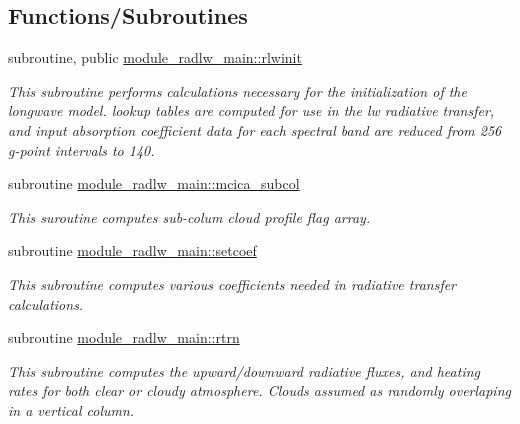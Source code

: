 \subsection*{Functions/\+Subroutines}
\begin{DoxyCompactItemize}
\item 
subroutine, public \hyperlink{namespacemodule__radlw__main_ad1f036ae760a7e9dcbbdd93492617bb3}{module\+\_\+radlw\+\_\+main\+::rlwinit}                                                                                             
\begin{DoxyCompactList}\small\item\em This subroutine performs calculations necessary for the initialization of the longwave model. lookup tables are computed for use in the lw radiative transfer, and input absorption coefficient data for each spectral band are reduced from 256 g-\/point intervals to 140. \end{DoxyCompactList}\item 
subroutine \hyperlink{namespacemodule__radlw__main_a6fd13528cd1e0335fb256c7f199e61bb}{module\+\_\+radlw\+\_\+main\+::mcica\+\_\+subcol}                                                                                   
\begin{DoxyCompactList}\small\item\em This suroutine computes sub-\/colum cloud profile flag array. \end{DoxyCompactList}\item 
subroutine \hyperlink{namespacemodule__radlw__main_a801f8ecd9281b8966caf536bebc5cc22}{module\+\_\+radlw\+\_\+main\+::setcoef}                                                                                             
\begin{DoxyCompactList}\small\item\em This subroutine computes various coefficients needed in radiative transfer calculations. \end{DoxyCompactList}\item 
subroutine \hyperlink{namespacemodule__radlw__main_a34aff059dd13272a3c45818ec40ba6d3}{module\+\_\+radlw\+\_\+main\+::rtrn}                                                                                                   
\begin{DoxyCompactList}\small\item\em This subroutine computes the upward/downward radiative fluxes, and heating rates for both clear or cloudy atmosphere. Clouds assumed as randomly overlaping in a vertical column. \end{DoxyCompactList}\item 

\end{DoxyCompactItemize}
